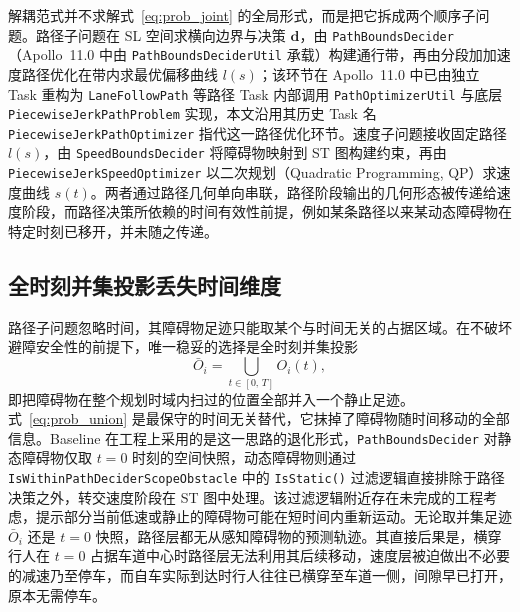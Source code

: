 \documentclass[a4paper,11pt]{ctexart}
\theoremstyle{definition}
\begin{document}
解耦范式并不求解式~\eqref{eq:prob_joint} 的全局形式，而是把它拆成两个顺序子问题。路径子问题在 SL 空间求横向边界与决策 $\mathbf{d}$，由 \texttt{PathBoundsDecider}（Apollo~11.0 中由 \texttt{PathBoundsDeciderUtil} 承载）构建通行带，再由分段加加速度路径优化在带内求最优偏移曲线 $l(s)$；该环节在 Apollo~11.0 中已由独立 Task 重构为 \texttt{LaneFollowPath} 等路径 Task 内部调用 \texttt{PathOptimizerUtil} 与底层 \texttt{PiecewiseJerkPathProblem} 实现，本文沿用其历史 Task 名 \texttt{PiecewiseJerkPathOptimizer} 指代这一路径优化环节。速度子问题接收固定路径 $l(s)$，由 \texttt{SpeedBoundsDecider} 将障碍物映射到 ST 图构建约束，再由 \texttt{PiecewiseJerkSpeedOptimizer} 以二次规划（Quadratic Programming, QP）求速度曲线 $s(t)$。两者通过路径几何单向串联，路径阶段输出的几何形态被传递给速度阶段，而路径决策所依赖的时间有效性前提，例如某条路径以来某动态障碍物在特定时刻已移开，并未随之传递。

\subsection{全时刻并集投影丢失时间维度}
\label{subsec:union_projection}

路径子问题忽略时间，其障碍物足迹只能取某个与时间无关的占据区域。在不破坏避障安全性的前提下，唯一稳妥的选择是全时刻并集投影
\begin{equation}
    \bar{O}_i = \bigcup_{t \in [0,\,T]} O_i(t),
    \label{eq:prob_union}
\end{equation}
即把障碍物在整个规划时域内扫过的位置全部并入一个静止足迹。式~\eqref{eq:prob_union} 是最保守的时间无关替代，它抹掉了障碍物随时间移动的全部信息。Baseline 在工程上采用的是这一思路的退化形式，\texttt{PathBoundsDecider} 对静态障碍物仅取 $t{=}0$ 时刻的空间快照，动态障碍物则通过 \texttt{IsWithinPathDeciderScopeObstacle} 中的 \texttt{IsStatic()} 过滤逻辑直接排除于路径决策之外，转交速度阶段在 ST 图中处理。该过滤逻辑附近存在未完成的工程考虑，提示部分当前低速或静止的障碍物可能在短时间内重新运动。无论取并集足迹 $\bar{O}_i$ 还是 $t{=}0$ 快照，路径层都无从感知障碍物的预测轨迹。其直接后果是，横穿行人在 $t{=}0$ 占据车道中心时路径层无法利用其后续移动，速度层被迫做出不必要的减速乃至停车，而自车实际到达时行人往往已横穿至车道一侧，间隙早已打开，原本无需停车。
\end{document}
